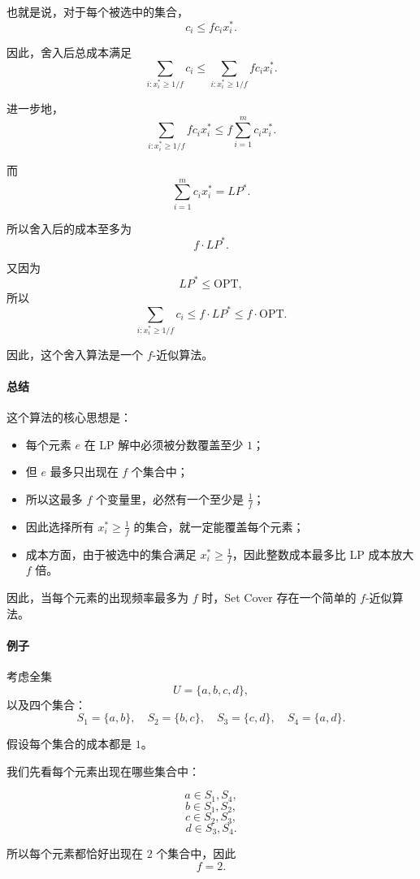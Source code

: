 \documentclass[UTF8,openany,12pt]{ctexbook}
\theoremstyle{remark}
\newcommand{\OPT}{\mathrm{OPT}}
\begin{document}
也就是说，对于每个被选中的集合，
\[
c_i \le f c_i x_i^*.
\]

因此，舍入后总成本满足
\[
\sum_{i: x_i^* \ge 1/f} c_i
\le
\sum_{i: x_i^* \ge 1/f} f c_i x_i^*.
\]

进一步地，
\[
\sum_{i: x_i^* \ge 1/f} f c_i x_i^*
\le
f \sum_{i=1}^m c_i x_i^*.
\]

而
\[
\sum_{i=1}^m c_i x_i^* = LP^*.
\]

所以舍入后的成本至多为
\[
f \cdot LP^*.
\]

又因为
\[
LP^* \le \OPT,
\]
所以
\[
\sum_{i: x_i^* \ge 1/f} c_i
\le f \cdot LP^*
\le f \cdot \OPT.
\]

因此，这个舍入算法是一个 $f$-近似算法。

\paragraph{总结}

这个算法的核心思想是：

\begin{itemize}
    \item 每个元素 $e$ 在 LP 解中必须被分数覆盖至少 $1$；
    \item 但 $e$ 最多只出现在 $f$ 个集合中；
    \item 所以这最多 $f$ 个变量里，必然有一个至少是 $\frac{1}{f}$；
    \item 因此选择所有 $x_i^* \ge \frac{1}{f}$ 的集合，就一定能覆盖每个元素；
    \item 成本方面，由于被选中的集合满足 $x_i^* \ge \frac{1}{f}$，因此整数成本最多比 LP 成本放大 $f$ 倍。
\end{itemize}

因此，当每个元素的出现频率最多为 $f$ 时，Set Cover 存在一个简单的 $f$-近似算法。

\paragraph{例子}

考虑全集
\[
U = \{a,b,c,d\},
\]
以及四个集合：
\[
S_1 = \{a,b\}, \quad
S_2 = \{b,c\}, \quad
S_3 = \{c,d\}, \quad
S_4 = \{a,d\}.
\]

假设每个集合的成本都是 $1$。

我们先看每个元素出现在哪些集合中：

\[
a \in S_1, S_4,
\]
\[
b \in S_1, S_2,
\]
\[
c \in S_2, S_3,
\]
\[
d \in S_3, S_4.
\]

所以每个元素都恰好出现在 $2$ 个集合中，因此
\[
f = 2.
\]
\end{document}
